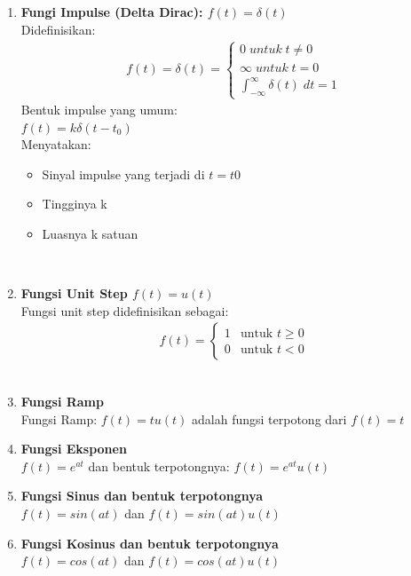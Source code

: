 \documentclass{article}
\begin{document}
\begin{enumerate}
    \item   \textbf{Fungi Impulse (Delta Dirac): $f(t) = \delta(t)$}\\
          Didefinisikan:
          \begin{align}
              f(t) = \delta (t) =
              \begin{cases}
                  0 \;untuk\; t \neq 0
                  \nonumber \\
                  \infty \;untuk\; t = 0
                  \nonumber \\
                  \int_{- \infty}^{\infty} \delta(t)\;dt=1
                  \nonumber
              \end{cases}
          \end{align}
          Bentuk impulse yang umum:\\
          $f(t) = k\delta(t-t_0)$ \\
          Menyatakan:
          \begin{itemize}
              \item Sinyal impulse yang terjadi di $t=t0$
              \item Tingginya k
              \item Luasnya k satuan
          \end{itemize}
          \leavevmode\\
    \item   \textbf{Fungsi Unit Step $f(t) = u(t)$}\\
          Fungsi unit step didefinisikan sebagai:
          \begin{align}
              f(t) =
              \begin{cases}
                  1 & \text{untuk $t \ge 0$}
                  \nonumber                  \\
                  0 & \text{untuk $t < 0$}
                  \nonumber
              \end{cases}
          \end{align}
          \leavevmode\\
    \item   \textbf{Fungsi Ramp}\\
          Fungsi Ramp: $f(t) = t u(t)$ adalah fungsi terpotong dari $f(t) = t$
          \leavevmode\\
    \item   \textbf{Fungsi Eksponen}\\
          $f(t) = e^{at}$ dan bentuk terpotongnya: $f(t) = e^{at} u(t)$
          \leavevmode\\
    \item   \textbf{Fungsi Sinus dan bentuk terpotongnya}\\
          $f(t) = sin(at)$ dan $f(t) = sin(at)u(t)$
          \leavevmode\\
    \item   \textbf{Fungsi Kosinus dan bentuk terpotongnya}\\
          $f(t) = cos(at)$ dan $f(t) = cos(at)u(t)$
          \leavevmode\\
\end{enumerate}
\end{document}
